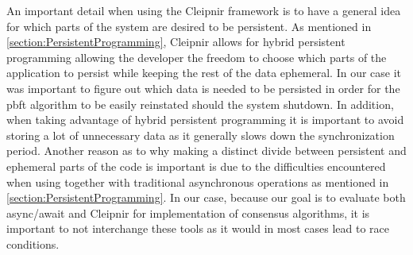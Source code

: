 
\label{sec:persvsephe}
An important detail when using the Cleipnir framework is to have a general idea for which parts of the system are desired to be persistent. As mentioned in \autoref{section:PersistentProgramming}, Cleipnir allows for hybrid persistent programming allowing the developer the freedom to choose which parts of the application to persist while keeping the rest of the data ephemeral. In our case it was important to figure out which data is needed to be persisted in order for the \ac{pbft} algorithm to be easily reinstated should the system shutdown. In addition, when taking advantage of hybrid persistent programming it is important to avoid storing a lot of unnecessary data as it generally slows down the synchronization period. Another reason as to why making a distinct divide between persistent and ephemeral parts of the code is important is due to the difficulties encountered when using  together with traditional asynchronous operations as mentioned in \autoref{section:PersistentProgramming}. In our case, because our goal is to evaluate both async/await and Cleipnir for implementation of consensus algorithms, it is important to not interchange these tools as it would in most cases lead to race conditions.

